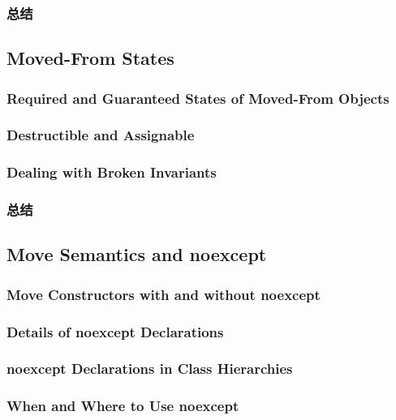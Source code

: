 \documentclass[11pt,a4paper,UTF8]{ctexart}
\begin{document}
		\subsubsection{总结}
	\subsection{Moved-From States}
		\subsubsection{Required and Guaranteed States of Moved-From Objects}
		\subsubsection{Destructible and Assignable}
		\subsubsection{Dealing with Broken Invariants}
		\subsubsection{总结}
	\subsection{Move Semantics and noexcept}
		\subsubsection{Move Constructors with and without noexcept}
		\subsubsection{Details of noexcept Declarations}
		\subsubsection{noexcept Declarations in Class Hierarchies}
		\subsubsection{When and Where to Use noexcept}
\end{document}
